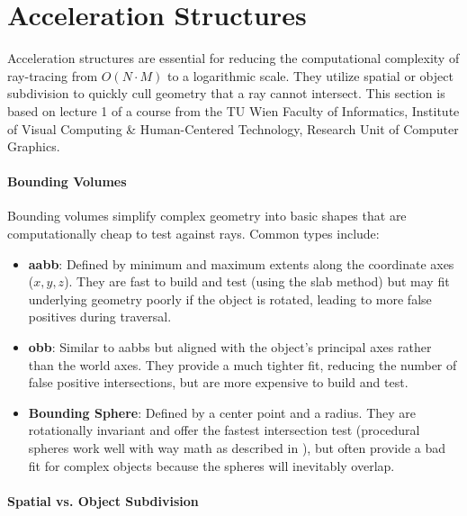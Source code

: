 \section{Acceleration Structures}\label{sec:acceleration-structures}

Acceleration structures are essential for reducing the computational complexity of ray-tracing
from $O(N \cdot M)$ to a logarithmic scale.
They utilize spatial or object subdivision to quickly cull geometry that a ray cannot intersect.
This section is based on lecture 1 of a course from the TU Wien Faculty of Informatics,
Institute of Visual Computing \& Human-Centered Technology,
Research Unit of Computer Graphics\cite{tuwien_rendering_2020}.


\paragraph{Bounding Volumes}\label{par:bounding-volumes}

Bounding volumes simplify complex geometry into basic shapes
that are computationally cheap to test against rays.
Common types include:

\begin{itemize}
    \item \textbf{\gls{aabb}}: {
        Defined by minimum and maximum extents along the coordinate axes ($x, y, z$).
        They are fast to build and test (using the slab method) but may fit underlying geometry poorly
        if the object is rotated, leading to more false positives during traversal.
    }
    \item \textbf{\gls{obb}}: {
        Similar to \glspl{aabb} but aligned with the object's principal axes rather than the world axes.
        They provide a much tighter fit, reducing the number of false positive intersections,
        but are more expensive to build and test.
    }
    \item \textbf{Bounding Sphere}: {
        Defined by a center point and a radius.
        They are rotationally invariant and offer the fastest intersection test
        (procedural spheres work well with way math as described in ),
        but often provide a bad fit for complex objects because the spheres will inevitably overlap.
    }
\end{itemize}

\paragraph{Spatial vs. Object Subdivision}\label{par:subdivision-types}

